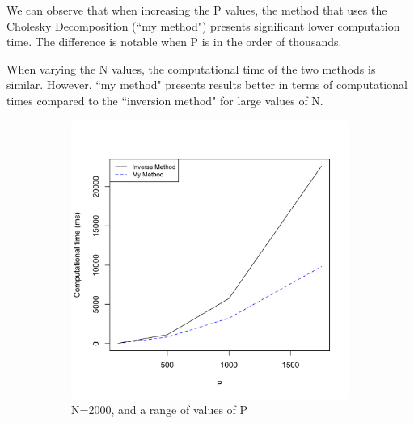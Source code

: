 \documentclass[11 pt]{article}
\begin{document}
\begin{enumerate}[label=(\Alph*)]
We can observe that when increasing the P values, the method that uses the Cholesky Decomposition (``my method") presents significant lower computation time. The difference is notable when P is in the order of thousands. 
 
When varying the N values, the computational time of the two methods is similar. However, ``my method" presents results better in terms of computational times compared to the ``inversion method" for large values of N.

\begin{figure}[H]
	\begin{center}
	\begin{subfigure}[h]{0.45\linewidth}
		\includegraphics[width=\linewidth]{Ex01R/Fig/P1CP.png}
		\caption{N=2000, and a range of values of P}
	\end{subfigure}
	\begin{subfigure}[h]{0.45\linewidth}

\end{subfigure}
\end{center}
\end{figure}
\end{enumerate}
\end{document}
